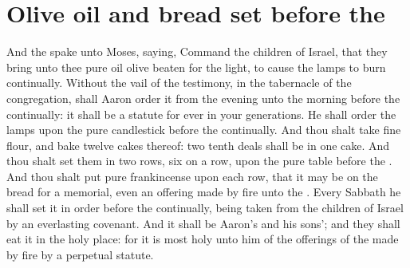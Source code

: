 \section*{Olive oil and bread set before the \LORD}
\begin{biblechapter} %
\verse And the \LORD spake unto Moses, saying,
\verse Command the children of Israel, that they bring unto thee pure oil olive beaten for the light, to cause the lamps to burn continually.
\verse Without the vail of the testimony, in the tabernacle of the congregation, shall Aaron order it from the evening unto the morning before the \LORD continually: it shall be a statute for ever in your generations.
\verse He shall order the lamps upon the pure candlestick before the \LORD continually.
\verse And thou shalt take fine flour, and bake twelve cakes thereof: two tenth deals shall be in one cake.
\verse And thou shalt set them in two rows, six on a row, upon the pure table before the \LORD.
\verse And thou shalt put pure frankincense upon each row, that it may be on the bread for a memorial, even an offering made by fire unto the \LORD.
\verse Every Sabbath he shall set it in order before the \LORD continually, being taken from the children of Israel by an everlasting covenant.
\verse And it shall be Aaron's and his sons'; and they shall eat it in the holy place: for it is most holy unto him of the offerings of the \LORD made by fire by a perpetual statute.

\end{biblechapter}
